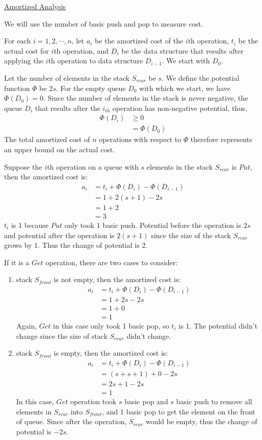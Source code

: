 \documentclass[11pt]{article}
\begin{document}
\begin{enumerate}
\underline{Amortized Analysis}

We will use the number of basic push and pop to measure cost.

For each $i=1,2,\cdots,n$, let $a_i$ be the amortized cost of the
$i$th operation, $t_i$ be the actual cost for $i$th operation, and
$D_i$ be the data structure that results after applying the $i$th
operation to data structure $D_{i-1}$. We start with $D_0$.

Let the number of elements in the stack $S_{rear}$ be $s$. 
We define the potential function $\Phi$ be $2s$. For the empty queue
$D_0$ with which we start, we have $\Phi(D_0) = 0$. Since the number
of elements in the stack is never negative, the queue $D_i$ that
results after the $i_{th}$ operation has non-negative potential, thus,
\begin{align}
  \Phi(D_i) &\geq 0\\
  &= \Phi(D_0)
\end{align}
The total amortized cost of $n$ operations with respect to $\Phi$
therefore represents an upper bound on the actual cost. 

Suppose the $i$th operation on a queue with $s$ elements in the stack
$S_{rear}$ is $Put$, then the amortized cost is:
\begin{align}
  a_i &= t_i + \Phi(D_i) - \Phi(D_{i-1})\\
  &= 1 + 2(s+1) - 2s\\
  &= 1 + 2\\
  &= 3
\end{align}
$t_i$ is 1 because $Put$ only took 1 basic push. Potential before the
operation is $2s$ and potential after the operation is $2(s+1)$ since
the size of the stack $S_{rear}$ grows by 1. Thus the change of
potential is 2.

If it is a $Get$ operation, there are two cases to consider:
\begin{enumerate}
\item stack $S_{front}$ is not empty, then the amortized cost is:
  \begin{align}
    a_i &= t_i + \Phi(D_i) - \Phi(D_{i-1})\\
    &= 1 + 2s - 2s\\
    &= 1 + 0\\
    &= 1
  \end{align}
  Again, $Get$ in this case only took 1 basic pop, so $t_i$ is 1. The
  potential didn't change since the size of stack $S_{rear}$ didn't
  change. 
\item stack $S_{front}$ is empty, then the amortized cost is:
  \begin{align}
    a_i &= t_i + \Phi(D_i) - \Phi(D_{i-1})\\
    &= (s+s+1) + 0 - 2s\\
    &= 2s + 1 - 2s\\
    &= 1
  \end{align}
  In this case, $Get$ operation took $s$ basic pop and $s$ basic push
  to remove all elements in $S_{rear}$ into $S_{front}$, and 1 basic
  pop to get the element on the front of queue. Since after the
  operation, $S_{rear}$ would be empty, thus the change of potential
  is $-2s$.
\end{enumerate}


\end{enumerate}
\end{document}
